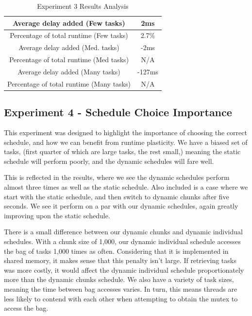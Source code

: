 \begin{table}[H]
\centering
	\begin{tabular}{|c|c|}
		\hline
		Average delay added (Few tasks) & 2ms \\
		\hline
		Percentage of total runtime (Few tasks) & 2.7\% \\
		\hline
		\hline
		Average delay added (Med. tasks) & -2ms \\
		\hline
		Percentage of total runtime (Med tasks) & N/A \\
		\hline
		\hline
		Average delay added (Many tasks) & -127ms \\
		\hline
		Percentage of total runtime (Many tasks) & N/A \\
		\hline
	\end{tabular}
	\caption{Experiment 3 Results Analysis}
	\label{table:results_experiment_3_results_analysis}
\end{table}





\subsection{Experiment 4 - Schedule Choice Importance}

This experiment was designed to highlight the importance of choosing the correct schedule, and how we can benefit from runtime plasticity. We have a biased set of tasks, (first quarter of which are large tasks, the rest small,) meaning the static schedule will perform poorly, and the dynamic schedules will fare well.

This is reflected in the results, where we see the dynamic schedules perform almost three times as well as the static schedule. Also included is a case where we start with the static schedule, and then switch to dynamic chunks after five seconds. We see it perform on a par with our dynamic schedules, again greatly improving upon the static schedule.

There is a small difference between our dynamic chunks and dynamic individual schedules. With a chunk size of 1,000, our dynamic individual schedule accesses the bag of tasks 1,000 times as often. Considering that it is implemented in shared memory, it makes sense that this penalty isn't large. If retrieving tasks was more costly, it would affect the dynamic individual schedule proportionately more than the dynamic chunks schedule. We also have a variety of task sizes, meaning the time between bag accesses varies. In turn, this means threads are less likely to contend with each other when attempting to obtain the mutex to access the bag.

